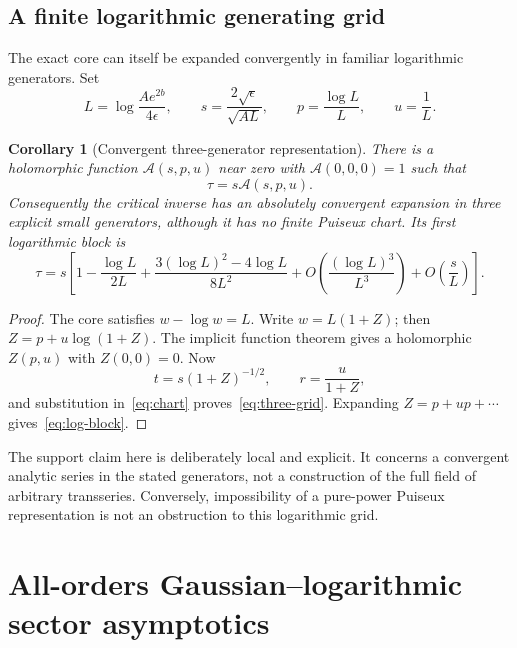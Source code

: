 \documentclass[11pt,a4paper]{article}
\numberwithin{equation}{section}
\newtheorem{corollary}[theorem]{Corollary}
\theoremstyle{definition}
\theoremstyle{remark}
\begin{document}
\subsection{A finite logarithmic generating grid}
The exact core can itself be expanded convergently in familiar logarithmic
generators. Set
\begin{equation}
 L=\log\frac{Ae^{2b}}{4\epsilon},\qquad
 s=\frac{2\sqrt\epsilon}{\sqrt{AL}},\qquad
 p=\frac{\log L}{L},\qquad u=\frac1L.
 \label{eq:log-generators}
\end{equation}

\begin{corollary}[Convergent three-generator representation]
There is a holomorphic function \(\mathcal A(s,p,u)\) near zero with
\(\mathcal A(0,0,0)=1\) such that
\begin{equation}
 \tau=s\mathcal A(s,p,u).
 \label{eq:three-grid}
\end{equation}
Consequently the critical inverse has an absolutely convergent expansion in
three explicit small generators, although it has no finite Puiseux chart.
Its first logarithmic block is
\begin{equation}
 \tau=s\left[1-\frac{\log L}{2L}
 +\frac{3(\log L)^2-4\log L}{8L^2}
 +O\!\left(\frac{(\log L)^3}{L^3}\right)+O\!\left(\frac{s}{L}\right)\right].
 \label{eq:log-block}
\end{equation}
\end{corollary}
\begin{proof}
The core satisfies \(w-\log w=L\). Write \(w=L(1+Z)\); then
\(Z=p+u\log(1+Z)\). The implicit function theorem gives a holomorphic
\(Z(p,u)\) with \(Z(0,0)=0\). Now
\[
 t=s(1+Z)^{-1/2},\qquad r=\frac{u}{1+Z},
\]
and substitution in~\eqref{eq:chart} proves~\eqref{eq:three-grid}.
Expanding \(Z=p+up+\cdots\) gives~\eqref{eq:log-block}.
\end{proof}

The support claim here is deliberately local and explicit. It concerns a
convergent analytic series in the stated generators, not a construction of
the full field of arbitrary transseries. Conversely, impossibility of a
pure-power Puiseux representation is not an obstruction to this logarithmic
grid.

\section{All-orders Gaussian--logarithmic sector asymptotics}
\label{sec:sectors}
\end{document}
